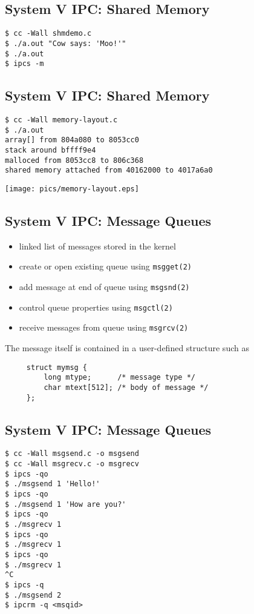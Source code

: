 \documentclass[xga]{xdvislides}
\begin{document}
\subsection{System V IPC: Shared Memory}
\begin{verbatim}
$ cc -Wall shmdemo.c
$ ./a.out "Cow says: 'Moo!'"
$ ./a.out
$ ipcs -m
\end{verbatim}

\subsection{System V IPC: Shared Memory}
\begin{verbatim}
$ cc -Wall memory-layout.c
$ ./a.out
array[] from 804a080 to 8053cc0
stack around bffff9e4
malloced from 8053cc8 to 806c368
shared memory attached from 40162000 to 4017a6a0
\end{verbatim}
\begin{center}
	\texttt{[image: pics/memory-layout.eps]}
\end{center}

\subsection{System V IPC: Message Queues}
\begin{itemize}
	\item linked list of messages stored in the kernel
	\item create or open existing queue using {\tt msgget(2)}
	\item add message at end of queue using {\tt msgsnd(2)}
	\item control queue properties using {\tt msgctl(2)}
	\item receive messages from queue using {\tt msgrcv(2)}
\end{itemize}
\vspace{.5in}
The message itself is contained in a user-defined structure such as
\begin{verbatim}
     struct mymsg {
         long mtype;      /* message type */
         char mtext[512]; /* body of message */
     };
\end{verbatim}

\subsection{System V IPC: Message Queues}
\begin{verbatim}
$ cc -Wall msgsend.c -o msgsend
$ cc -Wall msgrecv.c -o msgrecv
$ ipcs -qo
$ ./msgsend 1 'Hello!'
$ ipcs -qo
$ ./msgsend 1 'How are you?'
$ ipcs -qo
$ ./msgrecv 1
$ ipcs -qo
$ ./msgrecv 1
$ ipcs -qo
$ ./msgrecv 1
^C
$ ipcs -q
$ ./msgsend 2
$ ipcrm -q <msqid>
\end{verbatim}
\end{document}
